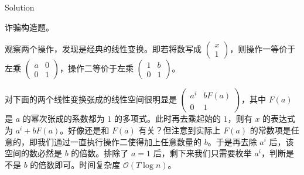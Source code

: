 \section{}

\begin{frame}{Solution}

诈骗构造题。

观察两个操作，发现是经典的线性变换。即若将数写成 $\begin{pmatrix}x\\1\end{pmatrix}$，则操作一等价于左乘 $\begin{pmatrix}a & 0 \\ 0 & 1\end{pmatrix}$，操作二等价于左乘 $\begin{pmatrix}1 & b \\ 0 & 1\end{pmatrix}$。

对下面的两个线性变换张成的线性空间很明显是 $\begin{pmatrix}a^i & bF(a) \\ 0 & 1\end{pmatrix}$，其中 $F(a)$ 是 $a$ 的幂次张成的系数都为 $1$ 的多项式。此时再去乘起始的 $1$，则有 $x$ 的表达式为 $a^i+bF(a)$。好像还是和 $F(a)$ 有关？但注意到实际上 $F(a)$ 的常数项是任意的，即我们通过一直执行操作二使得加上任意数量的 $b$。于是再去除 $a^i$ 后，该空间的数必然是 $b$ 的倍数。排除了 $a=1$ 后，剩下来我们只需要枚举 $a^i$，判断是不是 $b$ 的倍数即可。时间复杂度 $\mathcal O(T\log n)$。

\end{frame}